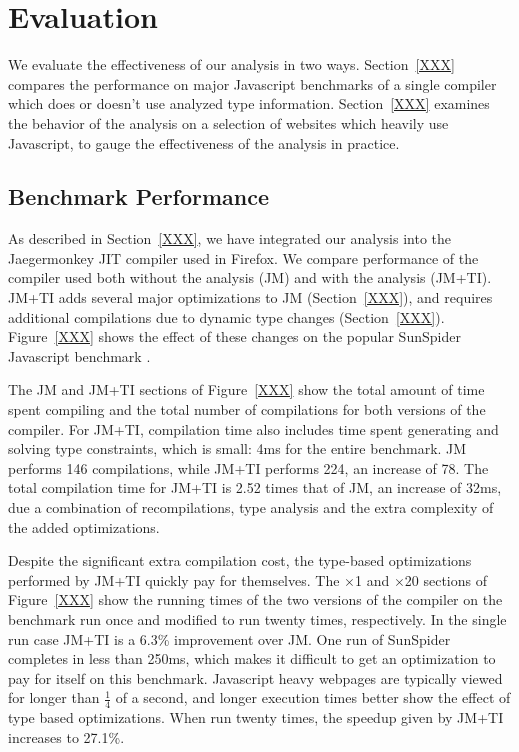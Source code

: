 
\section{Evaluation}

We evaluate the effectiveness of our analysis in two ways.
Section~\ref{XXX} compares the performance on major Javascript benchmarks
of a single compiler which does or doesn't use analyzed type information.
Section~\ref{XXX} examines the behavior of the analysis on a selection of
websites which heavily use Javascript, to gauge the effectiveness of the
analysis in practice.

\subsection{Benchmark Performance}

As described in Section~\ref{XXX}, we have integrated our analysis into
the Jaegermonkey JIT compiler used in Firefox.
We compare performance of the compiler used both without the analysis (JM)
and with the analysis (JM+TI).
JM+TI adds several major optimizations to JM (Section~\ref{XXX}),
and requires additional compilations due to dynamic type changes
(Section~\ref{XXX}).
Figure~\ref{XXX} shows the effect of these changes on the popular
SunSpider Javascript benchmark \cite{XXX}.

The JM and JM+TI sections of Figure~\ref{XXX} show the total amount of time
spent compiling and the total number of compilations for both versions of
the compiler.
For JM+TI, compilation time also includes time spent generating and solving
type constraints, which is small: 4ms for the entire benchmark.
JM performs 146 compilations, while JM+TI performs 224, an increase of 78.
The total compilation time for JM+TI is 2.52 times that of JM, an increase
of 32ms, due a combination of recompilations, type analysis and the extra
complexity of the added optimizations.

Despite the significant extra compilation cost, the type-based optimizations
performed by JM+TI quickly pay for themselves. The $\times$1 and
$\times$20 sections
of Figure~\ref{XXX} show the running times of the two versions of the
compiler on the benchmark run once and modified to run twenty times,
respectively.
In the single run case JM+TI is a 6.3\% improvement over JM.
One run of SunSpider completes in less than 250ms, which makes it
difficult to get an optimization to pay for itself on this benchmark.
Javascript heavy webpages are typically viewed for longer than
$\frac{1}{4}$ of a second, and longer execution times better show the effect
of type based optimizations.
When run twenty times, the speedup given by JM+TI increases to 27.1\%.

